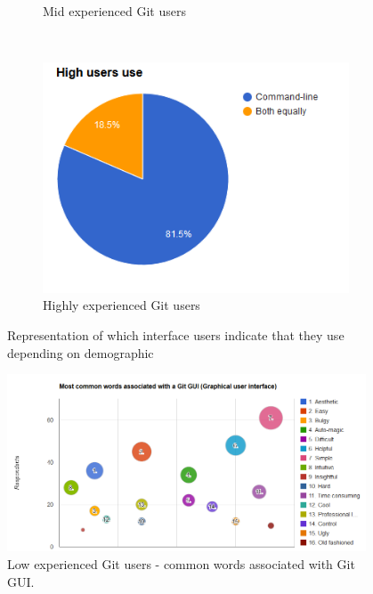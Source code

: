 \documentclass[a4paper,oneside]{bth} %
\begin{document}
\begin{figure}[H]
\begin{subfigure}[b]{0.315\textwidth}
						\caption{Mid experienced Git users}
						\label{fig:Mid users use}
					\end{subfigure}
					~
					\begin{subfigure}[b]{0.315\textwidth}
						\includegraphics[width=\textwidth]{graphs/high-users-use.png}
						\caption{Highly experienced Git users}
						\label{fig:High users use}
					\end{subfigure}
					\caption{Representation of which interface users indicate that they use depending on demographic}\label{fig:mid-high-users-use}
				\end{figure}
				\begin{figure}[H]
					\centering
					\includegraphics[width=0.95\textwidth]{graphs/common-words-low-users-gui.png}
					\caption{Low experienced Git users - common words associated with Git GUI.}
					\label{fig:Low users - common words associated with Git GUI.}
				\end{figure}
\end{document}
